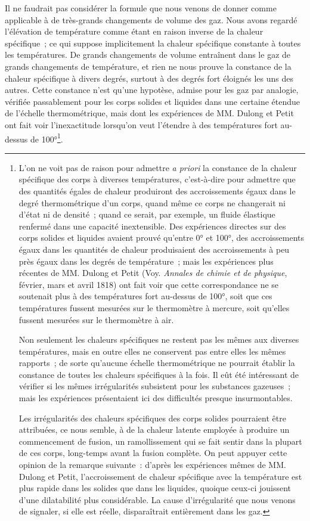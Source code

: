 \documentclass[french,twoside]{book} %
\begin{document}
Il ne faudrait pas considérer la formule que nous venons de donner comme applicable à de très-grands changements de volume des gaz. Nous avons regardé l’élévation de température comme étant en raison inverse de la chaleur spécifique ; ce qui suppose implicitement la chaleur spécifique constante à toutes les températures. De grands changements de volume entraînent dans le gaz de grands changements de température, et rien ne nous prouve la constance de la chaleur spécifique à divers degrés, surtout à des degrés fort éloignés les uns des autres. Cette constance n’est qu’une hypotèse, admise pour les gaz par analogie, vérifiée passablement pour les corps solides et liquides dans une certaine étendue de l’échelle thermométrique, mais dont les expériences de MM. Dulong et Petit ont fait voir l’inexactitude lorsqu’on veut l’étendre à des températures fort au-dessus de 100°\footnote{ \noindent L’on ne voit pas de raison pour admettre \emph{a priori} la constance de la chaleur spécifique des corps à diverses températures, c’est-à-dire pour admettre que des quantités égales de chaleur produiront des accroissements égaux dans le degré thermométrique d’un corps, quand même ce corps ne changerait ni d’état ni de densité ; quand ce serait, par exemple, un fluide élastique renfermé dans une capacité inextensible. Des expériences directes sur des corps solides et liquides avaient prouvé qu’entre 0° et 100°, des accroissements égaux dans les quantités de chaleur produisaient des accroissements à peu près égaux dans les degrés de température ; mais les expériences plus récentes de MM. Dulong et Petit (Voy. \emph{Annales de chimie et de physique}, février, mars et avril 1818) ont fait voir que cette correspondance ne se soutenait plus à des températures fort au-dessus de 100°, soit que ces températures fussent mesurées sur le thermomètre à mercure, soit qu’elles fussent mesurées sur le thermomètre à air.\par
 Non seulement les chaleurs spécifiques ne restent pas les mêmes aux diverses températures, mais en outre elles ne conservent pas entre elles les mêmes rapports ; de sorte qu’aucune échelle thermométrique ne pourrait établir la constance de toutes les chaleurs spécifiques à la fois. Il eût été intéressant de vérifier si les mêmes irrégularités subsistent pour les substances gazeuses ; mais les expériences présentaient ici des difficultés presque insurmontables.\par
 Les irrégularités des chaleurs spécifiques des corps solides pourraient être attribuées, ce nous semble, à de la chaleur latente employée à produire un commencement de fusion, un ramollissement qui se fait sentir dans la plupart de ces corps, long-temps avant la fusion complète. On peut appuyer cette opinion de la remarque suivante : d’après les expériences mêmes de MM. Dulong et Petit, l’accroissement de chaleur spécifique avec la température est plus rapide dans les solides que dans les liquides, quoique ceux-ci jouissent d’une dilatabilité plus considérable. La cause d’irrégularité que nous venons de signaler, si elle est réelle, disparaîtrait entièrement dans les gaz.
}.\par
\end{document}
